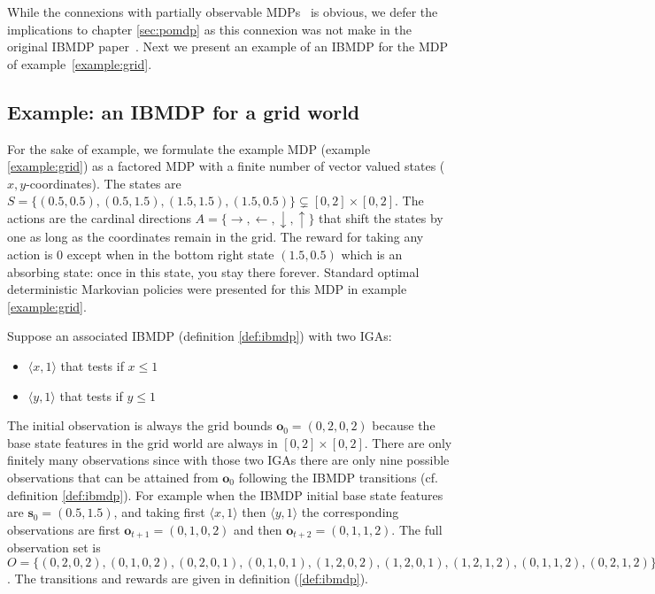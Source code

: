 While the connexions with partially observable MDPs~\cite{POMDP,chap2} is obvious, we defer the implications to chapter \ref{sec:pomdp} as this connexion was not make in the original IBMDP paper~\cite{topin2021iterative}.
Next we present an example of an IBMDP for the MDP of example~\ref{example:grid}.

\subsection{Example: an IBMDP for a grid world}
For the sake of example, we formulate the example MDP (example \ref{example:grid}) as a factored MDP with a finite number of vector valued states ($x,y$-coordinates).
The states are $S = \{(0.5, 0.5), (0.5, 1.5), (1.5, 1.5), (1.5, 0.5)\}\subsetneq [0, 2] \times [0, 2]$.
The actions are the cardinal directions $A = \{\rightarrow, \leftarrow, \downarrow, \uparrow\}$ that shift the states by one as long as the coordinates remain in the grid.
The reward for taking any action is 0 except when in the bottom right state $(1.5, 0.5)$ which is an absorbing state: once in this state, you stay there forever. 
Standard optimal deterministic Markovian policies were presented for this MDP in example \ref{example:grid}.

Suppose an associated IBMDP (definition \ref{def:ibmdp}) with two IGAs:
\begin{itemize}
    \item $\langle x, 1\rangle$ that tests if $x\leq 1$
    \item $\langle y, 1\rangle$ that tests if $y\leq 1$
\end{itemize}
The initial observation is always the grid bounds $\boldsymbol{o}_0=(0, 2, 0, 2)$ because the base state features in the grid world are always in $[0, 2] \times [0, 2]$.
There are only finitely many observations since with those two IGAs there are only nine possible observations that can be attained from $\boldsymbol{o}_0$ following the IBMDP transitions (cf. definition \ref{def:ibmdp}).
For example when the IBMDP initial base state features are $\boldsymbol{s}_0 = (0.5, 1.5)$, and taking first $\langle x, 1\rangle$ then $\langle y, 1\rangle$ the corresponding observations are first $\boldsymbol{o}_{t+1} = (0, 1, 0, 2)$ and then $\boldsymbol{o}_{t+2} = (0, 1, 1, 2)$.
The full observation set is $O = \{(0, 2, 0, 2), (0, 1, 0, 2), (0, 2, 0, 1), (0, 1, 0, 1), (1, 2, 0, 2), (1, 2, 0, 1), (1, 2, 1, 2), (0, 1, 1, 2), (0, 2, 1, 2)\}$.
The transitions and rewards are given in definition (\ref{def:ibmdp}).

